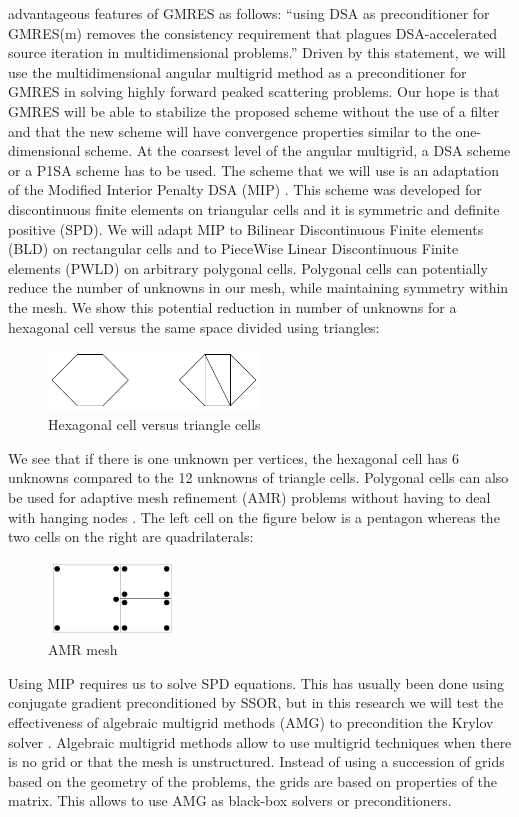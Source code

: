 advantageous features of GMRES as follows: ``using DSA as preconditioner for
GMRES(m) removes the consistency requirement that plagues DSA-accelerated
source iteration in multidimensional problems.'' Driven by this statement, we
will use the multidimensional angular multigrid method as a preconditioner for
GMRES in solving highly forward peaked scattering problems. Our hope is
that GMRES will be able to stabilize the proposed scheme without the use of a
filter and that the new scheme will have convergence properties similar to the
one-dimensional scheme. At the coarsest level of the angular multigrid, a DSA 
scheme or a P1SA scheme has to be used. The scheme that we will use is an 
adaptation of the Modified Interior Penalty DSA (MIP) \cite{mip}. This scheme 
was developed for discontinuous finite elements on triangular cells and it is 
symmetric and definite positive (SPD). We will adapt MIP to Bilinear
Discontinuous Finite elements (BLD) on rectangular cells and to PieceWise Linear 
Discontinuous Finite elements (PWLD) \cite{pwld_2d,pwld_3d} on arbitrary
polygonal cells. Polygonal cells can potentially reduce the number of unknowns in 
our mesh, while maintaining symmetry within the mesh. We show this potential 
reduction in number of unknowns for a hexagonal cell versus the same space divided 
using triangles:
\begin{figure}[H]
\centering
\includegraphics[width=0.5\textwidth]{./Introduction/hex_tri_cells}
\caption{Hexagonal cell versus triangle cells}
\end{figure}
We see that if there is one unknown per vertices, the hexagonal cell has 6
unknowns compared to the 12 unknowns of triangle cells. Polygonal cells can
also be used for adaptive mesh refinement (AMR) problems without having to
deal with hanging nodes \cite{arbitrary_hanging_nodes,dealII_hanging_nodes,
locally_hanging_nodes}. The left cell on the figure below is a pentagon whereas 
the two cells on the right are quadrilaterals:
\begin{figure}[H]
\centering
\includegraphics[width=0.3\textwidth]{./Introduction/amr}
\caption{AMR mesh}
\end{figure}
Using MIP requires us to solve SPD equations. This has usually been done using 
conjugate gradient preconditioned by SSOR, but in this research we will test the 
effectiveness of algebraic multigrid methods (AMG) to precondition the Krylov solver 
\cite{amg,amg_course}. Algebraic multigrid methods allow to use multigrid
techniques when there is no grid or that the mesh is unstructured. Instead of
using a succession of grids based on the geometry of the problems, the grids
are based on properties of the matrix. This allows to use AMG as black-box
solvers or preconditioners.

